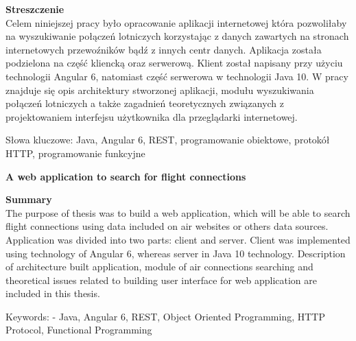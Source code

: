 \documentclass[a4paper, 12pt, twoside]{article}
\newcommand\tab[1][0.5cm]{\hspace*{#1}}
\newcommand\blankpage{%
	\null
    \thispagestyle{empty}%
    \newpage}
\begin{document}
\begin{flushleft}
	{\fontsize{14pt}{12pt}\selectfont
		\textbf{Streszczenie}}\\
	\vspace{1cm}
\tab Celem niniejszej pracy było opracowanie aplikacji internetowej która pozwoliłaby na wyszukiwanie połączeń lotniczych korzystając z danych zawartych na stronach internetowych przewoźników bądź z innych centr danych. Aplikacja została podzielona na część kliencką oraz serwerową. Klient został napisany przy użyciu technologii Angular 6, natomiast część serwerowa w technologii Java 10. W pracy znajduje się opis architektury stworzonej aplikacji, modułu wyszukiwania połączeń lotniczych a także zagadnień teoretycznych związanych z projektowaniem interfejsu użytkownika dla przeglądarki internetowej.
\end{flushleft}
\vspace{0.5cm}
Słowa kluczowe: Java, Angular 6, REST, programowanie obiektowe, protokół HTTP, programowanie funkcyjne

\vspace{1.5cm}

\begin{center}
	{\fontsize{14pt}{12pt}\selectfont
		\textbf{A web application to search for flight connections}}
\end{center}

\begin{flushleft}
	{\fontsize{14pt}{12pt}\selectfont
		\textbf{Summary}}\\
	\vspace{1cm}
\tab The purpose of thesis was to build a web application, which will be able to search flight connections using data included on air websites or others data sources. Application was divided into two parts: client and server. Client was implemented using technology of Angular 6, whereas server in Java 10 technology. Description of architecture built application, module of air connections searching and theoretical issues related to building user interface for web application are included in this thesis. 
\end{flushleft}
\vspace{0.5cm}
Keywords: - Java, Angular 6, REST, Object Oriented Programming, HTTP Protocol, Functional Programming
\afterpage{\blankpage}

\renewcommand{\contentsname}{Spis treści}
\newpage
{}
\setcounter{page}{9}
\tableofcontents
\newpage
\end{document}
